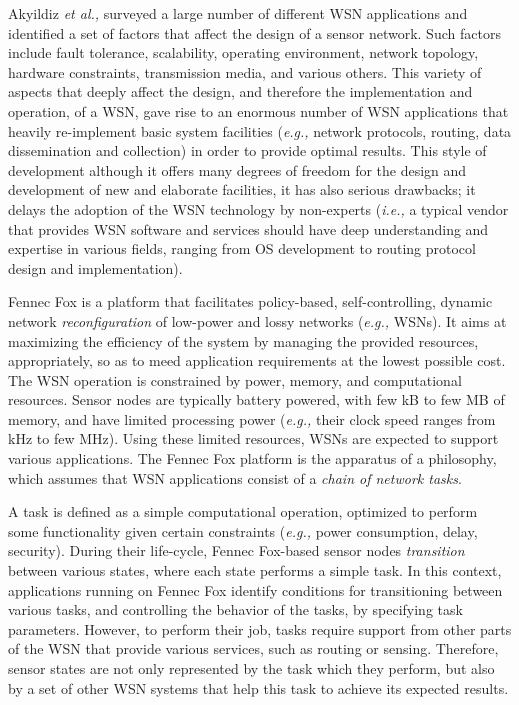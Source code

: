 \documentclass[11pt]{article}
\begin{document}
Akyildiz \textit{et al.,} \cite{wsn_survey} surveyed a large number of
different WSN applications and identified a set of factors that affect 
the design of a sensor network. Such factors include fault tolerance,
scalability, operating environment, network topology, hardware
constraints, transmission media, and various others. This variety of
aspects that deeply affect the design, and therefore the implementation
and operation, of a WSN, gave rise to an enormous number of WSN
applications that heavily re-implement basic system facilities
(\textit{e.g.,} network protocols, routing, data dissemination and
collection) in order to provide optimal results. This style of development
although it offers many degrees of freedom for the design and development 
of new and elaborate facilities, it has also serious drawbacks; it delays 
the adoption of the WSN technology by non-experts (\textit{i.e.,} a
typical vendor that provides WSN software and services should have deep
understanding and expertise in various fields, ranging from OS development
to routing protocol design and implementation). 

Fennec Fox is a platform that facilitates policy-based, self-controlling,
dynamic network \textit{reconfiguration} of low-power and lossy networks
(\textit{e.g.,} WSNs). It aims at maximizing the efficiency of the system
by managing the provided resources, appropriately, so as to meed
application requirements at the lowest possible cost. The WSN operation
is constrained by power, memory, and computational resources. Sensor nodes
are typically battery powered, with few kB to few MB of memory, and have
limited processing power (\textit{e.g.,} their clock speed ranges from kHz
to few MHz). Using these limited resources, WSNs are expected to support
various applications. The Fennec Fox platform is the apparatus of a
philosophy, which assumes that WSN applications consist of a \textit{chain
of network tasks}.

A task is defined as a simple computational operation, optimized to
perform some functionality given certain constraints (\textit{e.g.,} power
consumption, delay, security). During their life-cycle, Fennec Fox-based
sensor nodes \textit{transition} between various states, where each state
performs a simple task. In this context, applications running on Fennec
Fox identify conditions for transitioning between various tasks, and
controlling the behavior of the tasks, by specifying task parameters.
However, to perform their job, tasks require support from other parts of
the WSN that provide various services, such as routing or sensing.
Therefore, sensor states are not only represented by the task which they
perform, but also by a set of other WSN systems that help this task to
achieve its expected results. 
\end{document}
